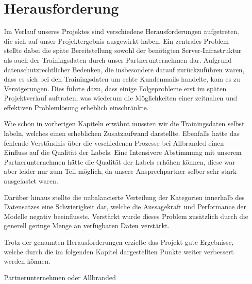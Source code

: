 \chapter{Herausforderung}

Im Verlauf unseres Projektes sind verschiedene Herausforderungen aufgetreten, die sich auf unser
Projektergebnis ausgewirkt haben. Ein zentrales Problem stellte dabei die späte Bereitstellung sowohl
der benötigten Server-Infrastruktur als auch der Trainingsdaten durch unser Partnerunternehmen dar.
Aufgrund datenschutzrechtlicher Bedenken, die insbesondere darauf zurückzuführen waren, dass es sich
bei den Trainingsdaten um echte Kundenmails handelte, kam es zu Verzögerungen. Dies führte dazu, dass
einige Folgeprobleme erst im späten Projektverlauf auftraten, was wiederum die Möglichkeiten einer
zeitnahen und effektiven Problemlösung erheblich einschränkte. 

Wie schon in vorherigen Kapiteln erwähnt mussten wir die Trainingsdaten selbst labeln, welches einen
erheblichen Zusatzaufwand darstellte. Ebenfalls hatte das fehlende Verständnis über die veschiedenen
Prozesse bei Allbranded einen Einfluss auf die Qualität der Labels. Eine Intensivere Abstimmung mit
unserem Partnerunternehmen hätte die Qualität der Labels erhöhen können, diese war aber leider nur
zum Teil möglich, da unsere Ansprechpartner selber sehr stark ausgelastet waren.  

Darüber hinaus stellte die unbalancierte Verteilung der Kategorien innerhalb des Datensatzes eine
Schwierigkeit dar, welche die Aussagekraft und Performance der Modelle negativ beeinflusste. Verstärkt
wurde dieses Problem zusätzlich durch die generell geringe Menge an verfügbaren Daten verstärkt.  

Trotz der genannten Herausforderungen erzielte das Projekt gute Ergebnisse, welche durch die im folgenden
Kapitel dargestellten Punkte weiter verbessert werden können. 

Partnerunternehmen oder Allbranded  